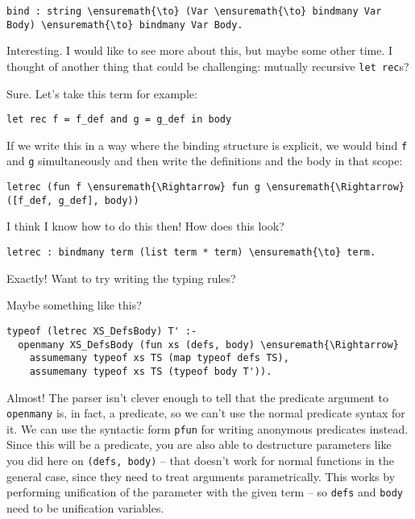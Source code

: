 \begin{verbatim}
bind : string \ensuremath{\to} (Var \ensuremath{\to} bindmany Var Body) \ensuremath{\to} bindmany Var Body.
\end{verbatim}

\heroSTUDENT{} Interesting. I would like to see more about this, but maybe
some other time. I thought of another thing that could be challenging:
mutually recursive \texttt{let\ rec}s?

\heroADVISOR{} Sure. Let's take this term for example:

\begin{verbatim}
let rec f = f_def and g = g_def in body
\end{verbatim}

If we write this in a way where the binding structure is explicit, we
would bind \texttt{f} and \texttt{g} simultaneously and then write the
definitions and the body in that scope:

\begin{verbatim}
letrec (fun f \ensuremath{\Rightarrow} fun g \ensuremath{\Rightarrow} ([f_def, g_def], body))
\end{verbatim}

\heroSTUDENT{} I think I know how to do this then! How does this look?

\begin{verbatim}
letrec : bindmany term (list term * term) \ensuremath{\to} term.
\end{verbatim}

\heroADVISOR{} Exactly! Want to try writing the typing rules?

\heroSTUDENT{} Maybe something like this?

\begin{verbatim}
typeof (letrec XS_DefsBody) T' :-
  openmany XS_DefsBody (fun xs (defs, body) \ensuremath{\Rightarrow}
    assumemany typeof xs TS (map typeof defs TS),
    assumemany typeof xs TS (typeof body T')).
\end{verbatim}

\heroADVISOR{} Almost! The parser isn't clever enough to tell that the
predicate argument to \texttt{openmany} is, in fact, a predicate, so we
can't use the normal predicate syntax for it. We can use the syntactic
form \texttt{pfun} for writing anonymous predicates instead. Since this
will be a predicate, you are also able to destructure parameters like
you did here on \texttt{(defs,\ body)} -- that doesn't work for normal
functions in the general case, since they need to treat arguments
parametrically. This works by performing unification of the parameter
with the given term -- so \texttt{defs} and \texttt{body} need to be
unification variables.

